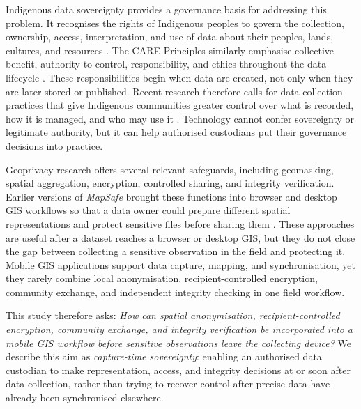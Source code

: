 \documentclass[]{interact}
\begin{document}
Indigenous data sovereignty provides a governance basis for addressing this problem. It recognises the rights of Indigenous peoples to govern the collection, ownership, access, interpretation, and use of data about their peoples, lands, cultures, and resources \citep{kukutai2016indigenous}. The CARE Principles similarly emphasise collective benefit, authority to control, responsibility, and ethics throughout the data lifecycle \citep{carroll2020care}. These responsibilities begin when data are created, not only when they are later stored or published. Recent research therefore calls for data-collection practices that give Indigenous communities greater control over what is recorded, how it is managed, and who may use it \citep{marriott2025indigenous,engstrom2024indigenous}. Technology cannot confer sovereignty or legitimate authority, but it can help authorised custodians put their governance decisions into practice.

Geoprivacy research offers several relevant safeguards, including geomasking, spatial aggregation, encryption, controlled sharing, and integrity verification. Earlier versions of \textit{MapSafe} brought these functions into browser and desktop GIS workflows so that a data owner could prepare different spatial representations and protect sensitive files before sharing them \citep{sharma2023mapsafe,sharma2024indigenous,sharma2025mapsafe}. These approaches are useful after a dataset reaches a browser or desktop GIS, but they do not close the gap between collecting a sensitive observation in the field and protecting it. Mobile GIS applications support data capture, mapping, and synchronisation, yet they rarely combine local anonymisation, recipient-controlled encryption, community exchange, and independent integrity checking in one field workflow.

This study therefore asks: \emph{How can spatial anonymisation, recipient-controlled encryption, community exchange, and integrity verification be incorporated into a mobile GIS workflow before sensitive observations leave the collecting device?} We describe this aim as \emph{capture-time sovereignty}: enabling an authorised data custodian to make representation, access, and integrity decisions at or soon after data collection, rather than trying to recover control after precise data have already been synchronised elsewhere.
\end{document}
